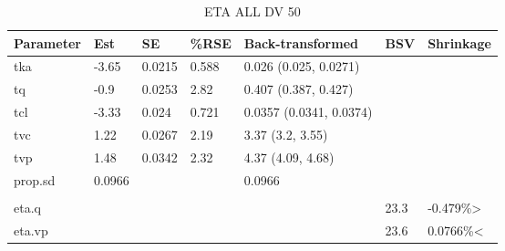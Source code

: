 \begin{table}
\centering\centering
\caption{ETA ALL DV 50}
\centering
\fontsize{8}{10}\selectfont
\begin{tabular}[t]{lllllll}
\toprule
\textbf{Parameter} & \textbf{Est} & \textbf{SE} & \textbf{\%RSE} & \textbf{Back-transformed} & \textbf{BSV} & \textbf{Shrinkage}\\
\midrule
tka & -3.65 & 0.0215 & 0.588 & 0.026 (0.025, 0.0271) &  & \\
\midrule
tq & -0.9 & 0.0253 & 2.82 & 0.407 (0.387, 0.427) &  & \\
\midrule
tcl & -3.33 & 0.024 & 0.721 & 0.0357 (0.0341, 0.0374) &  & \\
\midrule
tvc & 1.22 & 0.0267 & 2.19 & 3.37 (3.2, 3.55) &  & \\
\midrule
tvp & 1.48 & 0.0342 & 2.32 & 4.37 (4.09, 4.68) &  & \\
\midrule
prop.sd & 0.0966 &  &  & 0.0966 &  & \\
\midrule\\
eta.q &  &  &  &  & 23.3 & -0.479\%>\\
\midrule
eta.vp &  &  &  &  & 23.6 & 0.0766\%<\\
\bottomrule
\end{tabular}
\end{table}